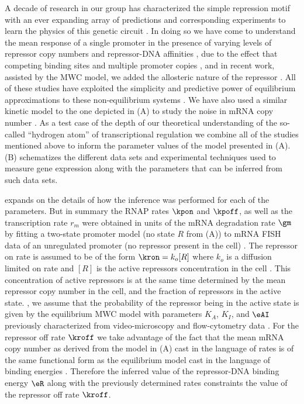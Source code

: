 A decade of research in our group has characterized the simple repression motif
with an ever expanding array of predictions and corresponding experiments to
learn the physics of this genetic circuit . In doing so
we have come to understand the mean response of a single promoter in the
presence of varying levels of repressor copy numbers and repressor-DNA
affinities \cite{Garcia2011c}, due to the effect that competing binding sites
and multiple promoter copies \cite{Brewster2014}, and in recent work, assisted
by the MWC model, we added the allosteric nature of the repressor
\cite{Razo-Mejia2018}. All of these studies have exploited the simplicity and
predictive power of equilibrium approximations to these non-equilibrium systems
\cite{Buchler2003}. We have also used a similar kinetic model to the one
depicted in (A) to study the noise in mRNA copy number
\cite{Jones2014a}. As a test case of the depth of our theoretical understanding
of the so-called ``hydrogen atom'' of transcriptional regulation we combine all
of the studies mentioned above to inform the parameter values of the model
presented in (A). (B)
schematizes the different data sets and experimental techniques used to measure
gene expression along with the parameters that can be inferred from such data
sets.

 expands on the details of how the inference was
performed for each of the parameters. But in summary the RNAP rates $\kpon$ and
$\kpoff$, as well as the transcription rate $r_m$ were obtained in units of the
mRNA degradation rate $\gm$ by fitting a two-state promoter model
\cite{Peccoud1995} (no state $R$ from (A)) to mRNA FISH
data of an unregulated promoter (no  repressor present in the cell)
\cite{Jones2014a}. The repressor on rate is assumed to be of the form $\kron =
k_o [R]$ where $k_o$ is a diffusion limited on rate and $[R]$ is the active
repressors concentration in the cell \cite{Jones2014a}. This concentration of
active repressors is at the same time determined by the mean repressor copy
number in the cell, and the fraction of repressors in the active state.
 , we assume that the probability of the repressor being in the
active state is given by the equilibrium MWC model with parameters $K_A$, $K_I$,
and $\eAI$ previously characterized from video-microscopy and flow-cytometry
data \cite{Razo-Mejia2018}. For the repressor off rate $\kroff$ we take
advantage of the fact that the mean mRNA copy number as derived from the model
in (A) cast in the language of rates is of the same
functional form as the equilibrium model cast in the language of binding
energies \cite{Phillips2015}. Therefore the inferred value of the repressor-DNA
binding energy $\eR$ along with the previously determined rates constraints the
value of the repressor off rate $\kroff$.


